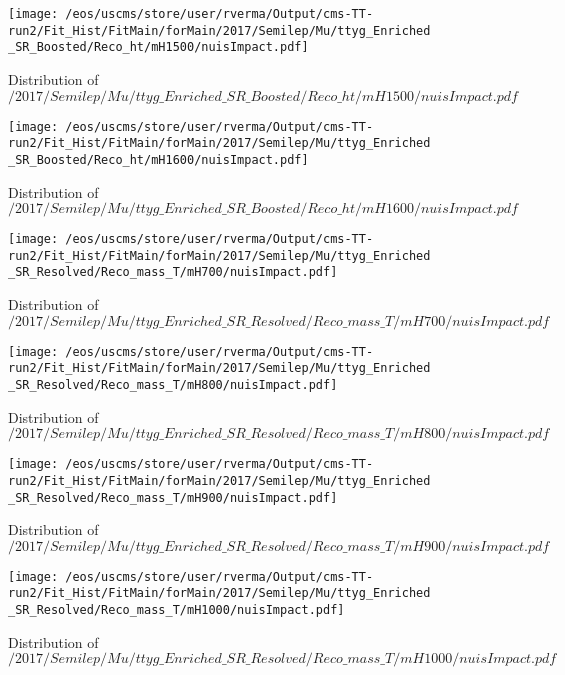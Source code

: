 \begin{figure}
\centering
\texttt{[image: /eos/uscms/store/user/rverma/Output/cms-TT-run2/Fit\_Hist/FitMain/forMain/2017/Semilep/Mu/ttyg\_Enriched\_SR\_Boosted/Reco\_ht/mH1500/nuisImpact.pdf]}
\caption{Distribution of $/2017/Semilep/Mu/ttyg\_Enriched\_SR\_Boosted/Reco\_ht/mH1500/nuisImpact.pdf$}
\end{figure}

\begin{figure}
\centering
\texttt{[image: /eos/uscms/store/user/rverma/Output/cms-TT-run2/Fit\_Hist/FitMain/forMain/2017/Semilep/Mu/ttyg\_Enriched\_SR\_Boosted/Reco\_ht/mH1600/nuisImpact.pdf]}
\caption{Distribution of $/2017/Semilep/Mu/ttyg\_Enriched\_SR\_Boosted/Reco\_ht/mH1600/nuisImpact.pdf$}
\end{figure}

\begin{figure}
\centering
\texttt{[image: /eos/uscms/store/user/rverma/Output/cms-TT-run2/Fit\_Hist/FitMain/forMain/2017/Semilep/Mu/ttyg\_Enriched\_SR\_Resolved/Reco\_mass\_T/mH700/nuisImpact.pdf]}
\caption{Distribution of $/2017/Semilep/Mu/ttyg\_Enriched\_SR\_Resolved/Reco\_mass\_T/mH700/nuisImpact.pdf$}
\end{figure}

\begin{figure}
\centering
\texttt{[image: /eos/uscms/store/user/rverma/Output/cms-TT-run2/Fit\_Hist/FitMain/forMain/2017/Semilep/Mu/ttyg\_Enriched\_SR\_Resolved/Reco\_mass\_T/mH800/nuisImpact.pdf]}
\caption{Distribution of $/2017/Semilep/Mu/ttyg\_Enriched\_SR\_Resolved/Reco\_mass\_T/mH800/nuisImpact.pdf$}
\end{figure}

\begin{figure}
\centering
\texttt{[image: /eos/uscms/store/user/rverma/Output/cms-TT-run2/Fit\_Hist/FitMain/forMain/2017/Semilep/Mu/ttyg\_Enriched\_SR\_Resolved/Reco\_mass\_T/mH900/nuisImpact.pdf]}
\caption{Distribution of $/2017/Semilep/Mu/ttyg\_Enriched\_SR\_Resolved/Reco\_mass\_T/mH900/nuisImpact.pdf$}
\end{figure}

\begin{figure}
\centering
\texttt{[image: /eos/uscms/store/user/rverma/Output/cms-TT-run2/Fit\_Hist/FitMain/forMain/2017/Semilep/Mu/ttyg\_Enriched\_SR\_Resolved/Reco\_mass\_T/mH1000/nuisImpact.pdf]}
\caption{Distribution of $/2017/Semilep/Mu/ttyg\_Enriched\_SR\_Resolved/Reco\_mass\_T/mH1000/nuisImpact.pdf$}
\end{figure}

